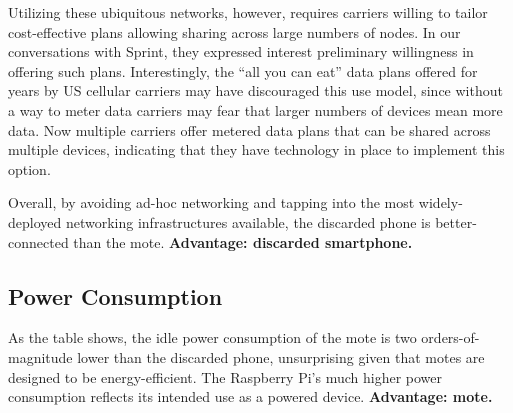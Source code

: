 Utilizing these ubiquitous networks, however, requires carriers willing to
tailor cost-effective plans allowing sharing across large numbers of nodes.
In our conversations with Sprint, they expressed interest preliminary
willingness in offering such plans. Interestingly, the ``all you can eat''
data plans offered for years by US cellular carriers may have discouraged
this use model, since without a way to meter data carriers may fear that
larger numbers of devices mean more data. Now multiple carriers offer metered
data plans that can be shared across multiple devices, indicating that they
have technology in place to implement this option.

Overall, by avoiding ad-hoc networking and tapping into the most
widely-deployed networking infrastructures available, the discarded phone is
better-connected than the mote. \textbf{Advantage: discarded smartphone.}

\subsection{Power Consumption}

As the table shows, the idle power consumption of the mote is two
orders-of-magnitude lower than the discarded phone, unsurprising given that
motes are designed to be energy-efficient. The Raspberry Pi's much higher
power consumption reflects its intended use as a powered device.
\textbf{Advantage: mote.}
